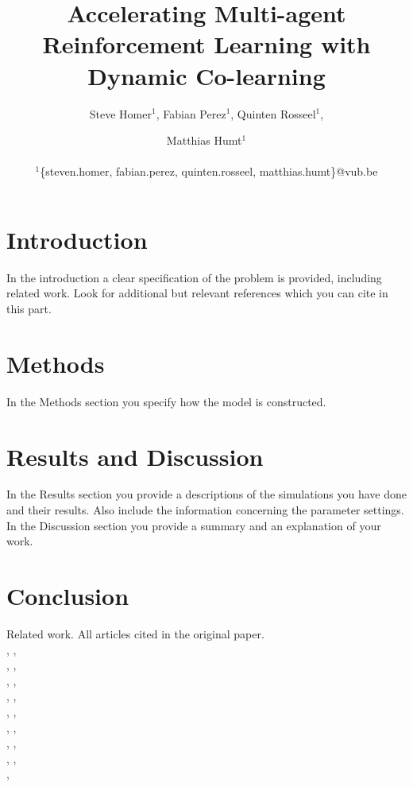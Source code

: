 \documentclass[letterpaper]{article}
\title{Accelerating Multi-agent Reinforcement Learning
with Dynamic Co-learning}
\author{Steve Homer$^1$, Fabian Perez$^1$, Quinten Rosseel$^1$, \and Matthias Humt$^1$ \\
\mbox{}\\
$^1$\{steven.homer, fabian.perez, quinten.rosseel, matthias.humt\}@vub.be}
\begin{document}
\maketitle

\begin{abstract}
 \blindtext
\end{abstract}

\section{Introduction}
In the introduction a clear specification of the problem is provided, including related work. Look for additional but relevant references which you can cite in this part.\\[.5cm]
\blindtext

\section{Methods}
In the Methods section you specify how the model is constructed.\\[.5cm]
\blindtext

\section{Results and Discussion}
In the Results section you provide a descriptions of the simulations you have done and their results.  Also include the information concerning the parameter settings.\\
In the Discussion section you provide a summary and an explanation of your work.\\[.5cm]
\blindtext

\section{Conclusion}
Related work. All articles cited in the original paper.\\[.5cm]
\citep{carroll2005task}, \citep{garant2015accelerating},\\ \citep{ghavamzadeh2006hierarchical}, \citep{gmytrasiewicz2005framework},\\ \citep{guestrin2002multiagent}, \citep{kitano1999robocup},\\ \citep{lazaric2008transfer}, \citep{littman2001value},\\ \citep{nair2005networked}, \citep{nedic2009distributed},\\ \citep{oliehoek2008exploiting}, \citep{price2003accelerating},\\ \citep{renyi1961measures}, \citep{taylor2009transfer},\\ \citep{vickrey2002multi}, \citep{witwicki2010influence},\\ \citep{zhang2010self}, \citep{zhang2013coordinating}

\footnotesize


\end{document}
